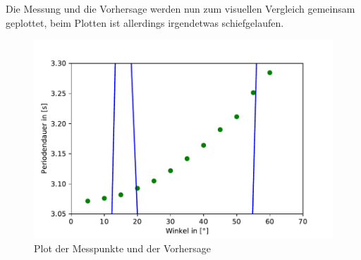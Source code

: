 Die Messung und die Vorhersage werden nun zum visuellen Vergleich gemeinsam geplottet, beim Plotten ist allerdings irgendetwas schiefgelaufen.

\begin{figure}[h!]
    \centering
    \includegraphics[scale=0.4]{./Pendel/Protokoll/fig/wtf.pdf}
    \caption{Plot der Messpunkte und der Vorhersage}
    \label{fig:Faden_Reg1}
\end{figure}